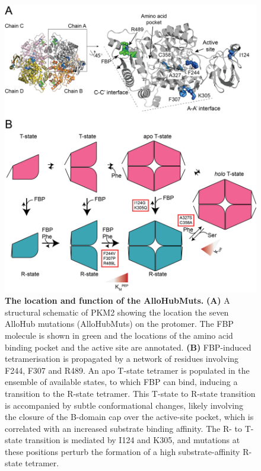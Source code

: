 %
%
%
\begin{figure}[!ht]
\includegraphics[scale=0.7]{allohubfrag_location.png}
\caption[The location and function of the AlloHubMuts.]{\textbf{The location and function of the AlloHubMuts.} \textbf{(A)} A structural schematic of PKM2 showing the location the seven AlloHub mutations (AlloHubMuts) on the protomer. The FBP molecule is shown in green and the locations of the amino acid binding pocket and the active site are annotated. \textbf{(B)} FBP-induced tetramerisation is propagated by a network of residues involving F244, F307 and R489. An apo T-state tetramer is populated in the ensemble of available states, to which FBP can bind, inducing a transition to the R-state tetramer. This T-state to R-state transition is accompanied by subtle conformational changes, likely involving the closure of the B-domain cap over the active-site pocket, which is correlated with an increased substrate binding affinity. The R- to T-state transition is mediated by I124 and K305, and mutations at these positions perturb the formation of a high substrate-affinity R-state tetramer.}
\label{fig:pkm2_structure_allohubmuts}
\end{figure}
